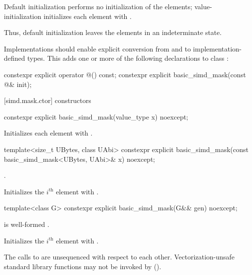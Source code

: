 \pnum
Default initialization performs no initialization of the elements; value-initialization initializes each element with . \begin{note}Thus, default initialization leaves the elements in an indeterminate state.\end{note}

\pnum
Implementations should enable explicit conversion from and to implementation-defined types. This adds one or more of the following declarations to class :

\begin{codeblock}
constexpr explicit operator @\impdef@() const;
constexpr explicit basic_simd_mask(const @\impdef@& init);
\end{codeblock}

\pnum
{}

[simd.mask.ctor]{ constructors}

\begin{itemdecl}
constexpr explicit basic_simd_mask(value_type x) noexcept;
\end{itemdecl}

\begin{itemdescr}
  \pnum\effects
  Initializes each element with .
\end{itemdescr}

\begin{itemdecl}
template<size_t UBytes, class UAbi>
  constexpr explicit basic_simd_mask(const basic_simd_mask<UBytes, UAbi>& x) noexcept;
\end{itemdecl}

\begin{itemdescr}
  \pnum\constraints
  .

  \pnum\effects
  Initializes the $i^\text{th}$ element with  \foralli.
\end{itemdescr}

\begin{itemdecl}
template<class G> constexpr explicit basic_simd_mask(G&& gen) noexcept;
\end{itemdecl}

\begin{itemdescr}
  \pnum\constraints
   is
  well-formed \foralli.

  \pnum\effects
  Initializes the $i^\text{th}$ element with
   \foralli.

  \pnum
  The calls to  are unsequenced with respect to each other.
  Vectorization-unsafe standard library functions may not be invoked by  ().
\end{itemdescr}

